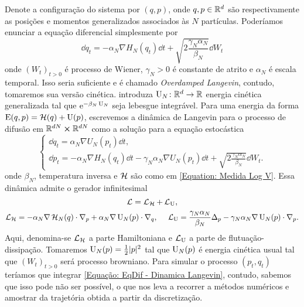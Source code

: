 Denote a configuração do sistema por $(q, p)$, onde $q,p \in \mathbb{R}^d$ são respectivamente as posições e momentos generalizados associados às $N$ partículas. Poderíamos enunciar a equação diferencial simplesmente por 
\begin{equation}
	\dd q_t = -\alpha_N \nabla H_N(q_t) \dd t + \sqrt{2\frac{\gamma_N \alpha_N}{\beta_N}} \dd W_t
	\label{Equação: Langevin Overdamped}
\end{equation}
onde $(W_t)_{t>0}$ é processo de Wiener, $\gamma_N > 0$ é constante de atrito e $\alpha_N$ é escala temporal. Isso seria suficiente e é chamado \textit{Overdamped Langevin}, contudo, tomaremos sua versão cinética. introduza $\operatorname{U}_N \colon \mathbb{R}^d \rightarrow \mathbb{R}$ energia cinética generalizada tal que $\operatorname{\textrm e}^{-\beta_N \operatorname{U}_N}$ seja lebesgue integrável. Para uma energia da forma $\operatorname{E}(q,p) = \operatorname{\mathcal{H}}(q) + \operatorname{U}(p)$, escrevemos a dinâmica de Langevin para o processo de difusão em $\mathbb{R}^{dN} \cross \mathbb{R}^{dN}$ como a solução para a equação estocástica \cite{Stoltz2018} 
\begin{equation}
\begin{cases}
	\dd q_t = \alpha_N \nabla U_N (p_t) \dd t, \\
	\dd p_t = -\alpha_N \nabla H_N(q_t) \dd t - \gamma_N \alpha_N \nabla U_N(p_t) \dd t + \sqrt{2\frac{\gamma_N \alpha_N}{\beta_N}} \dd W_t.
\end{cases}
\label{Equação: EqDif - Dinamica Langevin}
\end{equation}
onde $\beta_N$, temperatura inversa e $\operatorname{\mathcal{H}}$ são como em \ref{Equation: Medida Log V}. Essa dinâmica admite o gerador infinitesimal 
\[
	\operatorname{\mathcal{L}} = \operatorname{\mathcal{L}}_{\operatorname{\mathcal{H}}} + \operatorname{\mathcal{L}}_{\operatorname{U}},
\]
\[
 \operatorname{\mathcal{L}}_{\operatorname{\mathcal{H}}} = -\alpha_N \nabla\operatorname{\mathcal{H}}_N(q) \cdot \nabla_p + \alpha_N \nabla \operatorname{U}_N(p) \cdot \nabla_q, \ \ \ \ \operatorname{\mathcal{L}}_{\operatorname{U}} = \frac{\gamma_N\alpha_N}{\beta_N} \Delta_p - \gamma_N \alpha_N \nabla \operatorname{U}_N(p) \cdot \nabla_p.
\]
Aqui, denomina-se $\operatorname{\mathcal{L}}_{\operatorname{\mathcal{H}}}$ a parte Hamiltoniana e $\operatorname{\mathcal{L}}_{\operatorname{U}}$ a parte de flutuação-dissipação. Tomaremos $\operatorname{U}_N(p) = \frac{1}{2} |p|^2$ tal que $\operatorname{U}_N(p)$ é energia cinética usual tal que $(W_t)_{t>0}$ será processo browniano. Para simular o processo $(p_t,q_t)$ teríamos que integrar \ref{Equação: EqDif - Dinamica Langevin}, contudo, sabemos que isso pode não ser possível, o que nos leva a recorrer a métodos numéricos e amostrar da trajetória obtida a partir da discretização. 